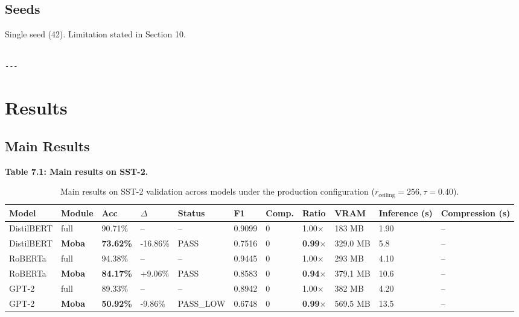 \subsection{Seeds}

Single seed (42). Limitation stated in Section 10.
\begin{lstlisting}

---
\end{lstlisting}

\section{Results}

\subsection{Main Results}

\textbf{Table 7.1: Main results on SST-2.}

\begin{table}[t]
\centering
\small
\begin{tabular}{lllllllllll}
\toprule
\textbf{Model} & \textbf{Module} & \textbf{Acc} & \textbf{$\Delta$} & \textbf{Status} & \textbf{F1} & \textbf{Comp.} & \textbf{Ratio} & \textbf{VRAM} & \textbf{Inference (s)} & \textbf{Compression (s)} \\
\midrule
DistilBERT & full & 90.71\% & -- & -- & 0.9099 & 0 & 1.00$\times$ & 183 MB & 1.90 & -- \\
DistilBERT & \textbf{Moba} & \textbf{73.62\%} & -16.86\% & PASS & 0.7516 & 0 & \textbf{0.99$\times$} & 329.0 MB & 5.8 & -- \\
RoBERTa & full & 94.38\% & -- & -- & 0.9445 & 0 & 1.00$\times$ & 293 MB & 4.10 & -- \\
RoBERTa & \textbf{Moba} & \textbf{84.17\%} & +9.06\% & PASS & 0.8583 & 0 & \textbf{0.94$\times$} & 379.1 MB & 10.6 & -- \\
GPT-2 & full & 89.33\% & -- & -- & 0.8942 & 0 & 1.00$\times$ & 382 MB & 4.20 & -- \\
GPT-2 & \textbf{Moba} & \textbf{50.92\%} & -9.86\% & PASS_LOW & 0.6748 & 0 & \textbf{0.99$\times$} & 569.5 MB & 13.5 & -- \\
\bottomrule
\end{tabular}
\caption{Main results on SST-2 validation across models under the production configuration ($r_{\mathrm{ceiling}}=256, \tau=0.40$).}
\label{tab:main_sst2}
\end{table}

